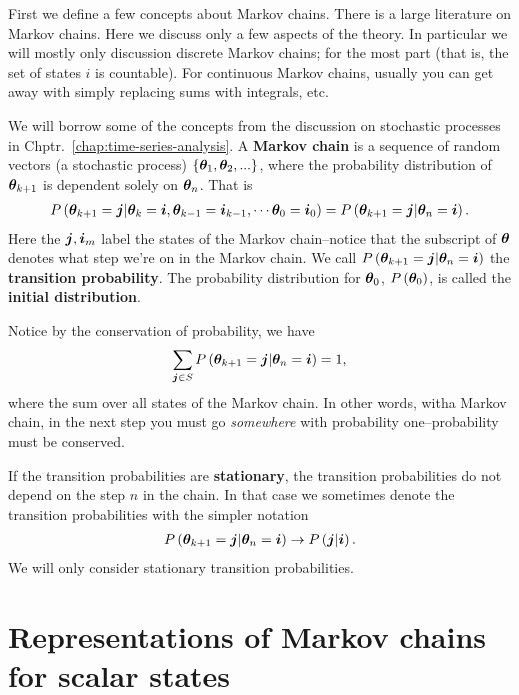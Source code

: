 
First we define a few concepts about Markov chains.
There is a large literature on Markov chains. 
Here we discuss only a few aspects of the theory. 
In particular we will mostly only discussion discrete Markov chains; for the most part (that is, the set of states $i$ is countable).
For continuous Markov chains, usually you can get away with simply replacing sums with integrals, etc.

We will borrow some of the concepts from the discussion on stochastic processes in Chptr.~\ref{chap:time-series-analysis}.
A \textbf{Markov chain} is a sequence of random vectors (a stochastic process) $\left\{{\bm \theta}_1,{\bm \theta}_2,...\right\}$, where the probability distribution of ${\bm \theta}_{k+1}$ is dependent solely on ${\bm \theta}_n$.
That is 
\begin{align}
    P\left({\bm \theta}_{k+1}={\bm j}|{\bm \theta}_{k}={\bm i}, {\bm \theta}_{k-1} = {\bm i}_{k-1}, \cdots {\bm \theta}_{0} = {\bm i}_0\right) 
     =
     P\left({\bm \theta}_{k+1}={\bm j}|{\bm \theta}_n={\bm i}\right)
     .
\end{align}
Here the ${\bm j},{\bm i}_m$ label the states of the Markov chain--notice that the subscript of ${\bm \theta}$ denotes what step we're on in the Markov chain. 
We call $P\left({\bm \theta}_{k+1}={\bm j}|{\bm \theta}_n={\bm i}\right)$ the \textbf{transition probability}. 
The probability distribution for ${\bm \theta}_0$, $P\left({\bm \theta}_0\right)$, is called the \textbf{initial distribution}.

Notice by the conservation of probability, we have
\begin{align}
    \label{eq:conservation-of-probability}
    \sum_{{\bm j}\in S}P\left({\bm \theta}_{k+1}={\bm j}|{\bm \theta}_n={\bm i}\right)
    =
    1
    ,
\end{align}
where the sum over all states of the Markov chain.
In other words, witha Markov chain, in the next step you must go \emph{somewhere} with probability one--probability must be conserved.


If the transition probabilities are \textbf{stationary}, the transition probabilities do not depend on the step $n$ in the chain.
In that case we sometimes denote the transition probabilities with the simpler notation 
\begin{align}
     P\left({\bm \theta}_{k+1}={\bm j}|{\bm \theta}_n={\bm i}\right)
     \to
     P\left({\bm j}|{\bm i}\right)
    .
\end{align}
We will only consider stationary transition probabilities.
\section{Representations of Markov chains for scalar states \label{sec:representations-markov-chains}}

